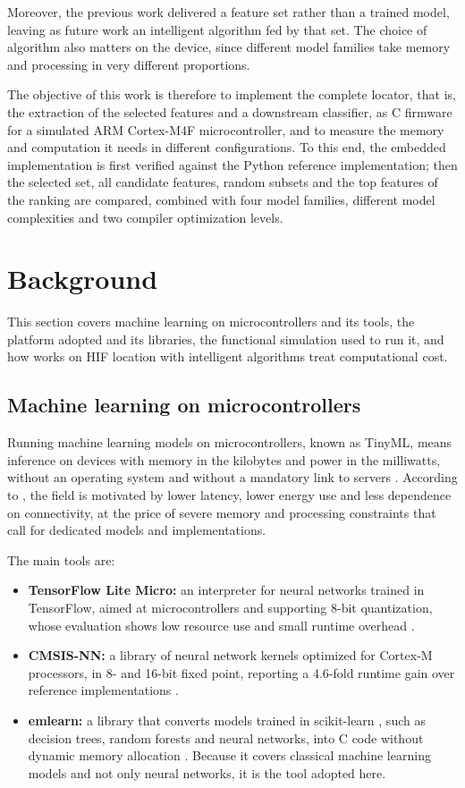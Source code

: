 \documentclass[11pt,a4paper]{article}
\begin{document}
Moreover, the previous work delivered a feature set rather than a trained model, leaving as future work an intelligent algorithm fed by that set. The choice of algorithm also matters on the device, since different model families take memory and processing in very different proportions.

The objective of this work is therefore to implement the complete locator, that is, the extraction of the selected features and a downstream classifier, as C firmware for a simulated ARM Cortex-M4F microcontroller, and to measure the memory and computation it needs in different configurations. To this end, the embedded implementation is first verified against the Python reference implementation; then the selected set, all candidate features, random subsets and the top features of the ranking are compared, combined with four model families, different model complexities and two compiler optimization levels.

\section{Background}
\label{sec:background}
This section covers machine learning on microcontrollers and its tools, the platform adopted and its libraries, the functional simulation used to run it, and how works on HIF location with intelligent algorithms treat computational cost.

\subsection{Machine learning on microcontrollers}
Running machine learning models on microcontrollers, known as TinyML, means inference on devices with memory in the kilobytes and power in the milliwatts, without an operating system and without a mandatory link to servers \citep{warden_tinyml}. According to \citet{ray_tinyml}, the field is motivated by lower latency, lower energy use and less dependence on connectivity, at the price of severe memory and processing constraints that call for dedicated models and implementations.

The main tools are:
\begin{itemize}
    \item \textbf{TensorFlow Lite Micro:} an interpreter for neural networks trained in TensorFlow, aimed at microcontrollers and supporting 8-bit quantization, whose evaluation shows low resource use and small runtime overhead \citep{david_tflm}.
    \item \textbf{CMSIS-NN:} a library of neural network kernels optimized for Cortex-M processors, in 8- and 16-bit fixed point, reporting a 4.6-fold runtime gain over reference implementations \citep{lai_cmsisnn}.
    \item \textbf{emlearn:} a library that converts models trained in scikit-learn \citep{[52]}, such as decision trees, random forests and neural networks, into C code without dynamic memory allocation \citep{nordby_emlearn}. Because it covers classical machine learning models and not only neural networks, it is the tool adopted here.
\end{itemize}
\end{document}
